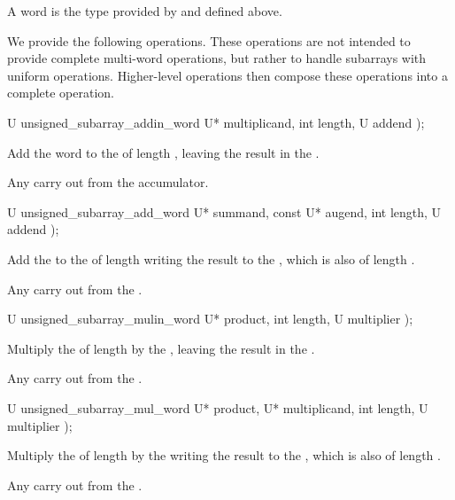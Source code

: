 A word is the type provided by  and defined above.

We provide the following operations. These operations are not intended to provide complete multi-word operations, but rather to handle subarrays with uniform operations. Higher-level operations then compose these operations into a complete operation.

\begin{itemdecl}
U unsigned_subarray_addin_word U* multiplicand, int length, U addend );		
\end{itemdecl}

\begin{itemdescr}
\effects Add the word  to the  of length , leaving the result in the .

\returns Any carry out from the accumulator.    	
\end{itemdescr}

\begin{itemdecl}
U unsigned_subarray_add_word U* summand, const U* augend, int length, U addend );    
\end{itemdecl}

\begin{itemdescr}
\effects Add the  to the  of length  writing the result to the , which is also of length .

\returns Any carry out from the .    
\end{itemdescr}

\begin{itemdecl}
U unsigned_subarray_mulin_word U* product, int length, U multiplier );    
\end{itemdecl}

\begin{itemdescr}
\effects Multiply the  of length  by the , leaving the result in the .

\returns Any carry out from the .    
\end{itemdescr}

\begin{itemdecl}
U unsigned_subarray_mul_word U* product, U* multiplicand, int length, U multiplier );    
\end{itemdecl}

\begin{itemdescr}
\effects Multiply the  of length  by the  writing the result to the , which is also of length .

\returns Any carry out from the .    
\end{itemdescr}

